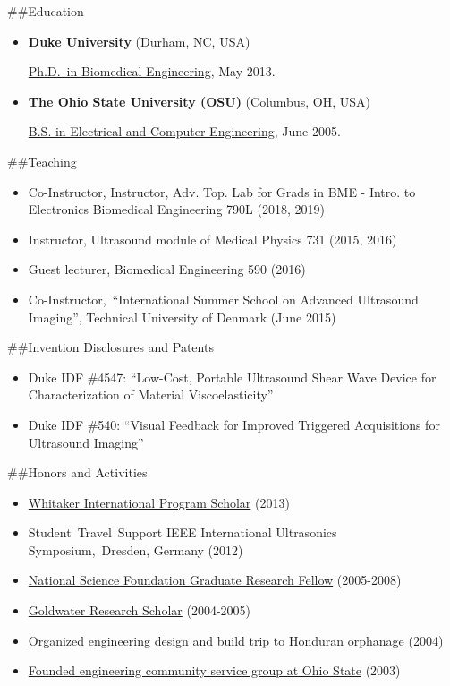 \documentclass[
]{article}
\providecommand{\tightlist}{%
  \setlength{\itemsep}{0pt}\setlength{\parskip}{0pt}}
\begin{document}
\#\#Education

\begin{itemize}
\item
  \textbf{Duke University} (Durham, NC, USA)

  \href{http://bme.duke.edu/grad}{Ph.D.~in Biomedical Engineering}, May
  2013.
\item
  \textbf{The Ohio State University (OSU)} (Columbus, OH, USA)

  \href{http://ece.osu.edu/futurestudents/undergrad}{B.S. in Electrical
  and Computer Engineering}, June 2005.
\end{itemize}

\#\#Teaching

\begin{itemize}
\tightlist
\item
  Co-Instructor, Instructor, Adv. Top. Lab for Grads in BME - Intro. to
  Electronics Biomedical Engineering 790L (2018, 2019)
\item
  Instructor, Ultrasound module of Medical Physics 731 (2015, 2016)
\item
  Guest lecturer, Biomedical Engineering 590 (2016)
\item
  Co-Instructor,~``International Summer School on Advanced Ultrasound
  Imaging'', Technical University of Denmark (June 2015)
\end{itemize}

\#\#Invention Disclosures and Patents

\begin{itemize}
\tightlist
\item
  Duke IDF \#4547: ``Low-Cost, Portable Ultrasound Shear Wave Device for
  Characterization of Material Viscoelasticity''
\item
  Duke IDF \#540: ``Visual Feedback for Improved Triggered Acquisitions
  for Ultrasound Imaging''
\end{itemize}

\#\#Honors and Activities

\begin{itemize}
\tightlist
\item
  \href{http://www.whitaker.org/grants/fellows-scholars}{Whitaker
  International Program Scholar} (2013)
\item
  Student~Travel~Support IEEE International Ultrasonics
  Symposium,~Dresden, Germany (2012)
\item
  \href{http://www.nsfgrfp.org/}{National Science Foundation Graduate
  Research Fellow} (2005-2008)
\item
  \href{https://goldwater.scholarsapply.org/}{Goldwater Research
  Scholar} (2004-2005)
\item
  \href{http://www.montanadeluz.org/}{Organized engineering design and
  build trip to Honduran orphanage} (2004)
\item
  \href{http://ecos.osu.edu/}{Founded engineering community service
  group at Ohio State} (2003)
\end{itemize}
\end{document}
